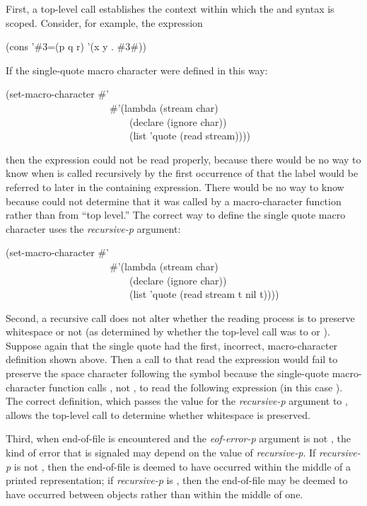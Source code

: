 First, a top-level call establishes the context within which the
 and  syntax is scoped.  Consider, for example,
the expression
\begin{lisp}
(cons '\#3=(p q r) '(x y . \#3\#))
\end{lisp}
If the single-quote macro character were defined in this way:
\begin{lisp}
(set-macro-character \#{\Xbackslash}' \\
~~~~~~~~~~~~~~~~~~~~~\#'(lambda (stream char) \\
~~~~~~~~~~~~~~~~~~~~~~~~~(declare (ignore char)) \\
~~~~~~~~~~~~~~~~~~~~~~~~~(list 'quote (read stream))))
\end{lisp}
then the expression could not be read properly, because there would be no way
to know when  is called recursively by the first
occurrence of  that the label  would be referred to
later in the containing expression.
There would be no way to know because 
could not determine that it was called by a macro-character function
rather than from ``top level.''  The correct way to define the single quote
macro character uses the \emph{recursive-p} argument:
\begin{lisp}
(set-macro-character \#{\Xbackslash}' \\
~~~~~~~~~~~~~~~~~~~~~\#'(lambda (stream char) \\
~~~~~~~~~~~~~~~~~~~~~~~~~(declare (ignore char)) \\
~~~~~~~~~~~~~~~~~~~~~~~~~(list 'quote (read stream t nil t))))
\end{lisp}

Second, a recursive call does not alter whether the reading process
is to preserve whitespace or not (as determined by whether the
top-level call was to  or ).
Suppose again that the single quote had the first, incorrect, macro-character
definition shown above.  Then a call to 
that read the expression  would fail to preserve the space
character following the symbol  because the single-quote
macro-character function calls , not ,
to read the following expression (in this case ).
The correct definition, which passes the value {\true} for the \emph{recursive-p}
argument to , allows the top-level call to determine
whether whitespace is preserved.

Third, when end-of-file is encountered and the \emph{eof-error-p} argument
is not {\nil}, the kind of error that is signaled may depend on the value
of \emph{recursive-p}.  If \emph{recursive-p} is not {\nil}, then the end-of-file
is deemed to have occurred within the middle of a printed representation;
if \emph{recursive-p} is {\nil}, then the end-of-file may be deemed to have
occurred between objects rather than within the middle of one.


